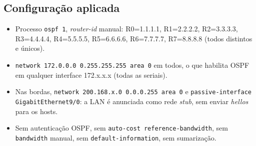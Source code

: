 \documentclass[12pt,a4paper]{article}
\begin{document}
\subsection{Configuração aplicada}
\begin{itemize}[nosep]
\item Processo \texttt{ospf 1}, \textit{router-id} manual: R0=1.1.1.1, R1=2.2.2.2, R2=3.3.3.3, R3=4.4.4.4, R4=5.5.5.5, R5=6.6.6.6, R6=7.7.7.7, R7=8.8.8.8 (todos distintos e únicos).
\item \texttt{network 172.0.0.0 0.255.255.255 area 0} em todos, o que habilita OSPF em qualquer interface 172.x.x.x (todas as seriais).
\item Nas bordas, \texttt{network 200.168.x.0 0.0.0.255 area 0} e \texttt{passive-interface GigabitEthernet9/0}: a LAN é anunciada como rede \textit{stub}, sem enviar \textit{hellos} para os hosts.
\item Sem autenticação OSPF, sem \texttt{auto-cost reference-bandwidth}, sem \texttt{bandwidth} manual, sem \texttt{default-information}, sem sumarização.
\end{itemize}
\end{document}
